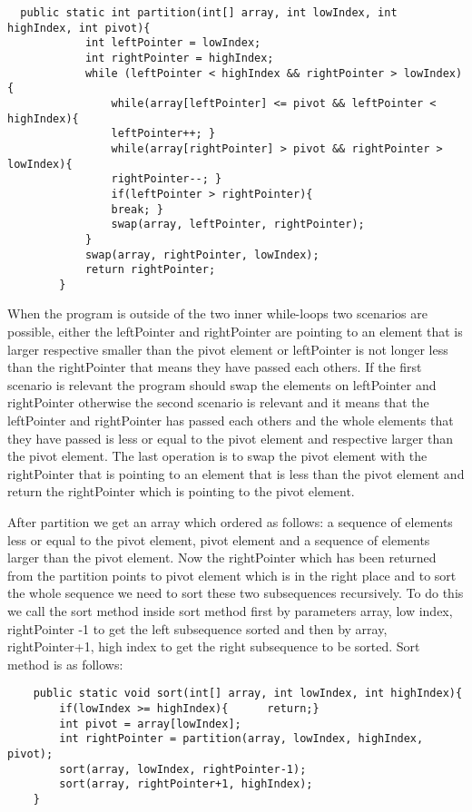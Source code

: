 \documentclass[a4paper,11pt]{article}
\begin{document}
 \begin{verbatim}
  public static int partition(int[] array, int lowIndex, int highIndex, int pivot){
            int leftPointer = lowIndex;
            int rightPointer = highIndex;
            while (leftPointer < highIndex && rightPointer > lowIndex){
                while(array[leftPointer] <= pivot && leftPointer < highIndex){	 
                leftPointer++; }
                while(array[rightPointer] > pivot && rightPointer > lowIndex){ 	
                rightPointer--; }
                if(leftPointer > rightPointer){ 	
                break; }
                swap(array, leftPointer, rightPointer);
            }
            swap(array, rightPointer, lowIndex);
            return rightPointer;
        }
   \end{verbatim} 
 When the program is outside of the two inner while-loops two scenarios are possible, either the leftPointer and rightPointer are pointing to an element that is larger respective smaller than the pivot element or leftPointer is not longer less than the rightPointer that means they have passed each others. If the first scenario is relevant the program should swap the elements on leftPointer and rightPointer otherwise the second scenario is relevant and it means that the leftPointer and rightPointer has passed each others and the whole elements that they have passed is less or equal to the pivot element and respective larger than the pivot element. The last operation is to swap the pivot element with the rightPointer that is pointing to an element that is less than the pivot element and return the rightPointer which is pointing to the pivot element.\newline
 
 After partition we get an array which ordered as follows: a sequence of elements less or equal to the pivot element, pivot element and a sequence of elements larger than the pivot element. Now the rightPointer which has been returned from the partition points to pivot element which is in the right place and to sort the whole sequence we need to sort these two subsequences recursively. To do this we call the sort method inside sort method first by parameters array, low index, rightPointer -1 to get the left subsequence sorted and then by array, rightPointer+1, high index to get the right subsequence to be sorted. Sort method is as follows:  
 
    \begin{verbatim}
    public static void sort(int[] array, int lowIndex, int highIndex){
        if(lowIndex >= highIndex){ 		return;}
        int pivot = array[lowIndex];
        int rightPointer = partition(array, lowIndex, highIndex, pivot);
        sort(array, lowIndex, rightPointer-1);
        sort(array, rightPointer+1, highIndex);
    }
    \end{verbatim}  
  
\end{document}
